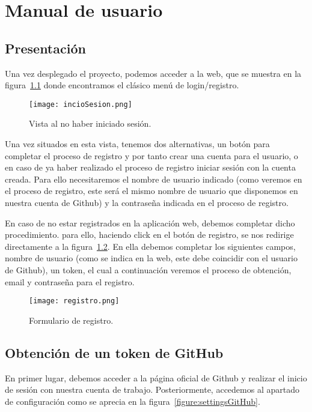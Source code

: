 \chapter{Manual de usuario\label{09manual}}

\section{Presentación}

Una vez desplegado el proyecto, podemos acceder a la web, que se muestra en
la figura~\ref{figure:inicioSesion} donde encontramos el clásico menú de
login/registro.

\begin{figure}[h!]
  \texttt{[image: incioSesion.png]}
  \caption{Vista al no haber iniciado sesión.}
  \label{figure:inicioSesion}
\end{figure}

Una vez situados en esta vista, tenemos dos alternativas, un botón para
completar el proceso de registro y por tanto crear una cuenta para el
usuario, o en caso de ya haber realizado el proceso de registro iniciar
sesión con la cuenta creada. Para ello necesitaremos el nombre de usuario
indicado (como veremos en el proceso de registro, este será el mismo nombre
de usuario que disponemos en nuestra cuenta de Github) y la contraseña
indicada en el proceso de registro.


En caso de no estar registrados en la aplicación web, debemos completar
dicho procedimiento. para ello, haciendo click en el botón de registro, se
nos redirige directamente a la figura~\ref{figure:registro}. En ella
debemos completar los siguientes campos, nombre de usuario (como se indica
en la web, este debe coincidir con el usuario de Github), un token, el cual
a continuación veremos el proceso de obtención, email y contraseña para el
registro.

\begin{figure}[h!]
  \texttt{[image: registro.png]}
  \caption{Formulario de registro.}
  \label{figure:registro}
\end{figure}


\section{Obtención de un token de GitHub}

En primer lugar, debemos acceder a la página oficial de Github\cite{GitHub}
y realizar el inicio de sesión con nuestra cuenta de trabajo.
Posteriormente, accedemos al apartado de configuración como se aprecia en
la figura~\ref{figure:settingsGitHub}.

